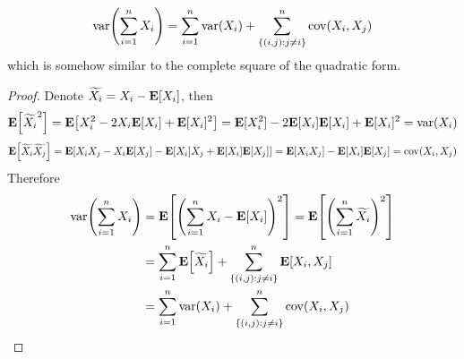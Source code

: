 \documentclass[device=normal, lang=en]{elegantbook}
\numberwithin{equation}{section}
\begin{document}
\begin{theorem}
    \begin{equation}
        \mathrm{var}\qty(\sum_{i=1}^{n} X_i) = \sum_{i=1}^{n} \mathrm{var}(X_i) + \sum_{\{(i,j): j \neq i\}}^{n} \mathrm{cov}(X_i, X_j)
    \end{equation}
    which is somehow similar to the complete square of the quadratic form.
\end{theorem}
\begin{proof}
    Denote $\widetilde{X_i} = X_i - \mathbf{E}[X_i]$, then
    \begin{equation}
        \mathbf{E}\qty[\widetilde{X_i}^2] = \mathbf{E}\qty[X_i^2 - 2X_i\mathbf{E}[X_i] + \mathbf{E}[X_i]^2] = \mathbf{E}[X_i^2] - 2\mathbf{E}[X_i]\mathbf{E}[X_i] + \mathbf{E}[X_i]^2 = \mathrm{var}(X_i)
    \end{equation}
    \begin{equation}
        \mathbf{E}\qty[\widetilde{X_i}\widetilde{X_j}] = \mathbf{E}\qty[X_i X_j - X_i \mathbf{E}[X_j] - \mathbf{E}[X_i] X_j + \mathbf{E}[X_i] \mathbf{E}[X_j]] = \mathbf{E}[X_i X_j] - \mathbf{E}[X_i]\mathbf{E}[X_j] = \mathrm{cov}(X_i, X_j)
    \end{equation} 
    Therefore
    \begin{equation}
    \begin{aligned}
        \mathrm{var}\qty(\sum_{i=1}^{n} X_i) &= \mathbf{E}\qty[\qty(\sum_{i=1}^{n}X_i - \mathbf{E}[X_i])^2] = \mathbf{E}\qty[\qty(\sum_{i=1}^{n} \widetilde{X_i})^2] \\ 
        &= \sum_{i=1}^{n}\mathbf{E}\qty[\widetilde{X_i}] + \sum_{\{(i,j): j \neq i\}}^{n}\mathbf{E}\qty[X_i, X_j] \\ 
        &= \sum_{i=1}^{n} \mathrm{var}(X_i) + \sum_{\{(i,j): j \neq i\}}^{n} \mathrm{cov}(X_i, X_j)
    \end{aligned}
    \end{equation}
\end{proof}
\end{document}
